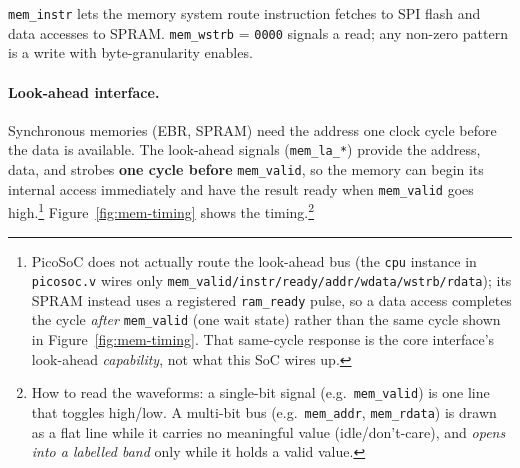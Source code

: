 \documentclass[9pt, a4paper]{extarticle}
\begin{document}
\texttt{mem\_instr} lets the memory system route instruction fetches to SPI flash and data accesses to SPRAM. \texttt{mem\_wstrb} = \texttt{0000} signals a read; any non-zero pattern is a write with byte-granularity enables.

\paragraph{Look-ahead interface.} Synchronous memories (EBR, SPRAM) need the address one clock cycle before the data is available. The look-ahead signals (\texttt{mem\_la\_*}) provide the address, data, and strobes \textbf{one cycle before} \texttt{mem\_valid}, so the memory can begin its internal access immediately and have the result ready when \texttt{mem\_valid} goes high.\footnote{PicoSoC does not actually route the look-ahead bus (the \texttt{cpu} instance in \texttt{picosoc.v} wires only \texttt{mem\_valid/instr/ready/addr/wdata/wstrb/rdata}); its SPRAM instead uses a registered \texttt{ram\_ready} pulse, so a data access completes the cycle \emph{after} \texttt{mem\_valid} (one wait state) rather than the same cycle shown in Figure~\ref{fig:mem-timing}. That same-cycle response is the core interface's look-ahead \emph{capability}, not what this SoC wires up.} Figure~\ref{fig:mem-timing} shows the timing.\footnote{How to read the waveforms: a single-bit signal (e.g.\ \texttt{mem\_valid}) is one line that toggles high/low. A multi-bit bus (e.g.\ \texttt{mem\_addr}, \texttt{mem\_rdata}) is drawn as a flat line while it carries no meaningful value (idle/don't-care), and \emph{opens into a labelled band} only while it holds a valid value.}
\end{document}
